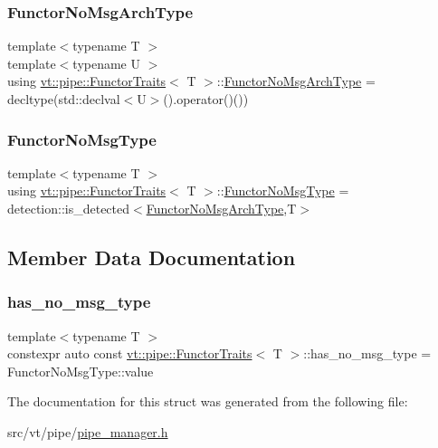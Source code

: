\subsubsection{\texorpdfstring{Functor\+No\+Msg\+Arch\+Type}{FunctorNoMsgArchType}}
{\footnotesize\ttfamily template$<$typename T $>$ \\
template$<$typename U $>$ \\
using \hyperlink{structvt_1_1pipe_1_1_functor_traits}{vt\+::pipe\+::\+Functor\+Traits}$<$ T $>$\+::\hyperlink{structvt_1_1pipe_1_1_functor_traits_af2002cb6723439f6b1e74c7a70255cc8}{Functor\+No\+Msg\+Arch\+Type} =  decltype(std\+::declval$<$U$>$().operator()())}

\mbox{\label{structvt_1_1pipe_1_1_functor_traits_a2b729de8c328206718e4eea1d9b30f9b}} 
\subsubsection{\texorpdfstring{Functor\+No\+Msg\+Type}{FunctorNoMsgType}}
{\footnotesize\ttfamily template$<$typename T $>$ \\
using \hyperlink{structvt_1_1pipe_1_1_functor_traits}{vt\+::pipe\+::\+Functor\+Traits}$<$ T $>$\+::\hyperlink{structvt_1_1pipe_1_1_functor_traits_a2b729de8c328206718e4eea1d9b30f9b}{Functor\+No\+Msg\+Type} =  detection\+::is\+\_\+detected$<$\hyperlink{structvt_1_1pipe_1_1_functor_traits_af2002cb6723439f6b1e74c7a70255cc8}{Functor\+No\+Msg\+Arch\+Type},T$>$}



\subsection{Member Data Documentation}
\mbox{\label{structvt_1_1pipe_1_1_functor_traits_aace8b00c70112f7711ce73f1799f7e00}} 
\subsubsection{\texorpdfstring{has\+\_\+no\+\_\+msg\+\_\+type}{has\_no\_msg\_type}}
{\footnotesize\ttfamily template$<$typename T $>$ \\
constexpr auto const \hyperlink{structvt_1_1pipe_1_1_functor_traits}{vt\+::pipe\+::\+Functor\+Traits}$<$ T $>$\+::has\+\_\+no\+\_\+msg\+\_\+type = Functor\+No\+Msg\+Type\+::value\hspace{0.3cm}{\ttfamily [static]}}



The documentation for this struct was generated from the following file\+:\begin{DoxyCompactItemize}
\item 
src/vt/pipe/\hyperlink{pipe__manager_8h}{pipe\+\_\+manager.\+h}\end{DoxyCompactItemize}

